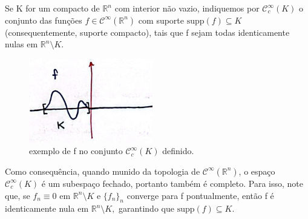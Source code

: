 \documentclass[../distribution_theory_notes.tex]{subfiles}
\begin{document}
  \begin{example}
    Se K for um compacto de \(\mathbb{R}^{n}\) com interior não vazio, indiquemos por \(\mathcal{C}_{c}^{\infty}(K)\) o conjunto das funções \(f\in \mathcal{C}^{\infty}(\mathbb{R}^{n})\) com suporte \(\mathrm{supp}(f)\subseteq K\) (consequentemente, suporte compacto), tais que f sejam todas identicamente nulas em \(\mathbb{R}^{n}\setminus{K}.\) 
 \begin{figure}[H]
 \begin{center}
 \includegraphics[height=\textheight, width=\textwidth, keepaspectratio]{./Images/compact_support_04.png}
 \end{center}
 \caption{exemplo de f no conjunto \(\mathcal{C}_{c}^{\infty}(K)\) definido.}
 \end{figure}

 Como consequência, quando munido da topologia de \(\mathcal{C}^{\infty}(\mathbb{R}^{n})\), o espaço \(\mathcal{C}_{c}^{\infty}(K)\) é um subespaço fechado, portanto também é completo. Para isso, note que, se \(f_{n}\equiv 0\) em \(\mathbb{R}^{n}\setminus{K}\) e \(\{f_{n}\}_{n}\) converge para f pontualmente, então f é identicamente nula em \(\mathbb{R}^{n}\setminus{K},\) garantindo que \(\mathrm{supp}(f)\subseteq K.\)
  \end{example}
\end{document}
